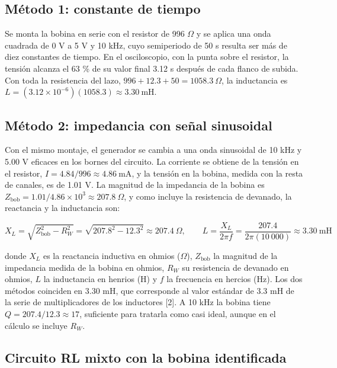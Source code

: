\documentclass[11pt,letterpaper]{article}
\begin{document}
\subsection{Método 1: constante de tiempo}

Se monta la bobina en serie con el resistor de 996 \ensuremath{\Omega} y se aplica una onda cuadrada de 0 V a 5 V y 10 kHz, cuyo semiperiodo de 50 \textmu{}s resulta ser más de diez constantes de tiempo. En el osciloscopio, con la punta sobre el resistor, la tensión alcanza el 63 \% de su valor final 3.12 \textmu{}s después de cada flanco de subida. Con toda la resistencia del lazo, $996 + 12.3 + 50 = 1058.3\ \Omega$, la inductancia es $L = (3.12 \times 10^{-6})(1058.3) \approx 3.30\ \text{mH}$.

\subsection{Método 2: impedancia con señal sinusoidal}

Con el mismo montaje, el generador se cambia a una onda sinusoidal de 10 kHz y 5.00 V eficaces en los bornes del circuito. La corriente se obtiene de la tensión en el resistor, $I = 4.84/996 \approx 4.86\ \text{mA}$, y la tensión en la bobina, medida con la resta de canales, es de 1.01 V. La magnitud de la impedancia de la bobina es $Z_{\mathrm{bob}} = 1.01/4.86 \times 10^{3} \approx 207.8\ \Omega$, y como incluye la resistencia de devanado, la reactancia y la inductancia son:

\begin{equation}
  X_L = \sqrt{Z_{\mathrm{bob}}^{2} - R_W^{2}} = \sqrt{207.8^{2} - 12.3^{2}} \approx 207.4\ \Omega, \qquad L = \frac{X_L}{2\pi f} = \frac{207.4}{2\pi(10\ 000)} \approx 3.30\ \text{mH}
\end{equation}

donde $X_L$ es la reactancia inductiva en ohmios (\ensuremath{\Omega}), $Z_{\mathrm{bob}}$ la magnitud de la impedancia medida de la bobina en ohmios, $R_W$ su resistencia de devanado en ohmios, $L$ la inductancia en henrios (H) y $f$ la frecuencia en hercios (Hz). Los dos métodos coinciden en 3.30 mH, que corresponde al valor estándar de 3.3 mH de la serie de multiplicadores de los inductores [2]. A 10 kHz la bobina tiene $Q = 207.4/12.3 \approx 17$, suficiente para tratarla como casi ideal, aunque en el cálculo se incluye $R_W$.

\subsection{Circuito RL mixto con la bobina identificada}
\end{document}

